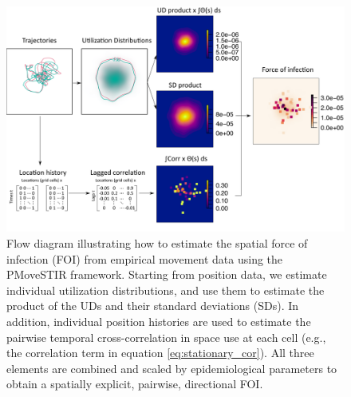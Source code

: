 \documentclass[letterpaper]{article}
\begin{document}
 \begin{figure}
     \includegraphics[width=\textwidth]{figures/steps_diagram.png}
     \caption{Flow diagram illustrating how to estimate the spatial force of infection (FOI) from empirical movement data using the PMoveSTIR framework. Starting from position data, we estimate individual utilization distributions, and use them to estimate the product of the UDs and their standard deviations (SDs). In addition, individual position histories are used to estimate the pairwise temporal cross-correlation in space use at each cell (e.g., the correlation term in equation \ref{eq:stationary_cor}). All three elements are combined and scaled by epidemiological parameters to obtain a spatially explicit, pairwise, directional FOI.} %
  \label{fig:steps}
 \end{figure}
\end{document}
